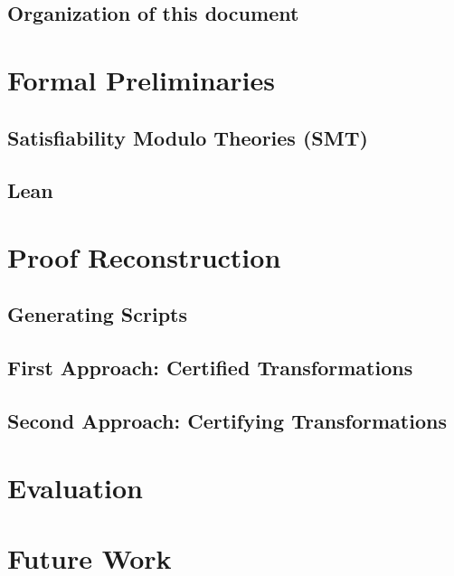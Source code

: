 \documentclass[
	msc,
	english
]{ppgccufmg}
\begin{document}
	  \section{Organization of this document}
	    
	\chapter{Formal Preliminaries}
	  \section{Satisfiability Modulo Theories (SMT)}\label{sec:smt}
	    
	  \section{Lean}
      
	\chapter{Proof Reconstruction}\label{chap:rcons}
    
    \section{Generating Scripts}\label{sec:gen-scripts}
    
    \section{First Approach: Certified Transformations}
    
    \section{Second Approach: Certifying Transformations}
    
	\chapter{Evaluation}
	\chapter{Future Work}\label{chap:future}

		
		
\end{document}
